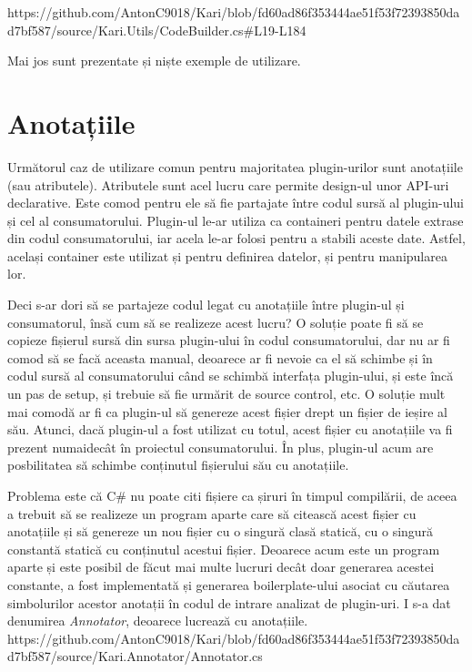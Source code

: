 \documentclass[a4paper,12pt]{report}
\begin{document}
https://github.com/AntonC9018/Kari/blob/fd60ad86f353444ae51f53f72393850dad7bf587/source/Kari.Utils/CodeBuilder.cs#L19-L184

Mai jos sunt prezentate și niște exemple de utilizare.

\section{Anotațiile}

Următorul caz de utilizare comun pentru majoritatea plugin-urilor sunt anotațiile (sau atributele).
Atributele sunt acel lucru care permite design-ul unor \ac{API}-uri declarative.
Este comod pentru ele să fie partajate între codul sursă al plugin-ului și cel al consumatorului.
Plugin-ul le-ar utiliza ca containeri pentru datele extrase din codul consumatorului, iar acela le-ar folosi pentru a stabili aceste date.
Astfel, același container este utilizat și pentru definirea datelor, și pentru manipularea lor.

Deci s-ar dori să se partajeze codul legat cu anotațiile între plugin-ul și consumatorul, însă cum să se realizeze acest lucru?
O soluție poate fi să se copieze fișierul sursă din sursa plugin-ului în codul consumatorului, dar nu ar fi comod să se facă aceasta manual, deoarece ar fi nevoie ca el să schimbe și în codul sursă al consumatorului când se schimbă interfața plugin-ului, și este încă un pas de setup, și trebuie să fie urmărit de source control, etc.
O soluție mult mai comodă ar fi ca plugin-ul să genereze acest fișier drept un fișier de ieșire al său.
Atunci, dacă plugin-ul a fost utilizat cu totul, acest fișier cu anotațiile va fi prezent numaidecât în proiectul consumatorului.
În plus, plugin-ul acum are posbilitatea să schimbe conținutul fișierului său cu anotațiile.

Problema este că C\# nu poate citi fișiere ca șiruri în timpul compilării, de aceea a trebuit să se realizeze un program aparte care să citească acest fișier cu anotațiile și să genereze un nou fișier cu o singură clasă statică, cu o singură constantă statică cu conținutul acestui fișier.
Deoarece acum este un program aparte și este posibil de făcut mai multe lucruri decât doar generarea acestei constante, a fost implementată și generarea boilerplate-ului asociat cu căutarea simbolurilor acestor anotații în codul de intrare analizat de plugin-uri.
I s-a dat denumirea \emph{Annotator}, deoarece lucrează cu anotațiile.
https://github.com/AntonC9018/Kari/blob/fd60ad86f353444ae51f53f72393850dad7bf587/source/Kari.Annotator/Annotator.cs
\end{document}
